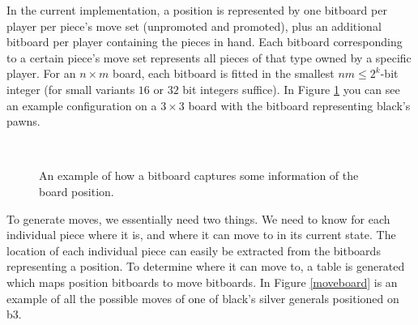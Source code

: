 \documentclass{article}
\begin{document}
In the current implementation, a position is represented by one bitboard per player per piece's move set (unpromoted and promoted), plus an additional
bitboard per player containing the pieces in hand. Each bitboard corresponding to a certain piece's move set represents all pieces of that type
owned by a specific player. For an $n \times m$ board, each bitboard is fitted in the smallest $nm \leq 2^k$-bit integer (for small
variants $16$ or $32$ bit integers suffice). In Figure \ref{bitboard} you can see an example configuration on a $3 \times 3$ board with the
bitboard representing black's pawns.

\begin{figure}[h]
\center

    \mbox{
       \quad
      }

\caption{An example of how a bitboard captures some information of the board position.}
\label{bitboard}
\end{figure}

To generate moves, we essentially need two things. We need to know for each individual piece where it is, and where it can move to in its current state.
The location of each individual piece can easily be extracted from the bitboards representing a position. To determine where it can move to, a table
is generated which maps position bitboards to move bitboards. In Figure \ref{moveboard} is an example of all the possible moves of one of black's silver
generals positioned on b3.
\end{document}

